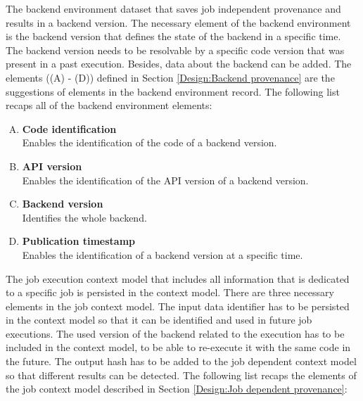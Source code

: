 \documentclass[draft,final]{vutinfth} %
\begin{document}
The backend environment dataset that saves job independent provenance and results in a backend version. The necessary element of the backend environment is the backend version that defines the state of the backend in a specific time. The backend version needs to be resolvable by a specific code version that was present in a past execution. Besides, data about the backend can be added. The elements ((A) - (D)) defined in Section \ref{Design:Backend provenance} are the suggestions of elements in the backend environment record. The following list recaps all of the backend environment elements: 

\begin{enumerate}[(A)]
	\item \textbf{Code identification} \\
	Enables the identification of the code of a backend version.
	\item \textbf{API version} \\
	Enables the identification of the API version of a backend version.
	\item \textbf{Backend version} \\ 
	Identifies the whole backend.
	\item \textbf{Publication timestamp} \\ 
	Enables the identification of a backend version at a specific time.
\end{enumerate}

The job execution context model that includes all information that is dedicated to a specific job is persisted in the context model. There are three necessary elements in the job context model. The input data identifier has to be persisted in the context model so that it can be identified and used in future job executions. The used version of the backend related to the execution has to be included in the context model, to be able to re-execute it with the same code in the future. The output hash has to be added to the job dependent context model so that different results can be detected. The following list recaps the elements of the job context model described in Section \ref{Design:Job dependent provenance}: 
\end{document}
